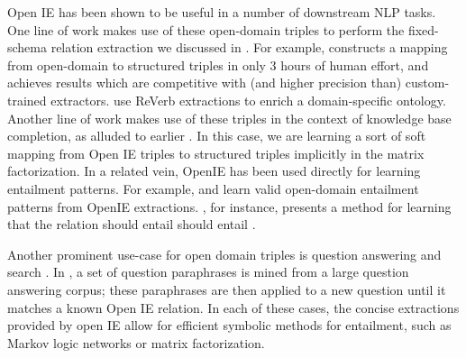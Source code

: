 Open IE has been shown to be useful in a number of downstream NLP tasks.
One line of work makes use of these open-domain triples to perform
  the fixed-schema relation extraction we discussed in .
For example, \cite{key:2013soderland-kbp} constructs a mapping from open-domain
  to structured triples in only 3 hours of human effort, and achieves results
  which are competitive with (and higher precision than) custom-trained
  extractors.
 use ReVerb extractions to 
    enrich a domain-specific ontology.
Another line of work makes use of these triples in the context of knowledge
  base completion, as alluded to earlier \cite{key:2012yao-schemas,key:2013riedel-schemas}.
In this case, we are learning a sort of soft mapping from Open IE triples to
  structured triples implicitly in the matrix factorization.
In a related vein, OpenIE has been used directly for learning entailment patterns.
For example,  and 
  learn valid open-domain entailment patterns from OpenIE extractions.
, for instance, presents a method for learning
  that the relation  should entail  should entail
  .

Another prominent use-case for open domain triples is
  question answering and search \cite{key:2014fader-openqa,key:2011etzioni-nature}. 
In , a set of question paraphrases is mined from a large
  question answering corpus; these paraphrases are then applied to a new question until
  it matches a known Open IE relation.
In each of these cases, the concise extractions provided by open IE allow
  for efficient symbolic methods for entailment, such as Markov logic
  networks or matrix factorization.


%
%

